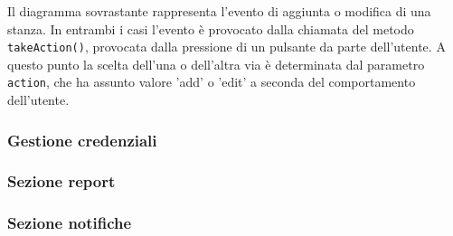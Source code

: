Il diagramma sovrastante rappresenta l'evento di aggiunta o modifica di una stanza.
In entrambi i casi l'evento è provocato dalla chiamata del metodo \texttt{takeAction()}, provocata dalla pressione di un pulsante da parte dell'utente. A questo punto la scelta dell'una o dell'altra via è determinata dal parametro \texttt{action}, che ha assunto valore 'add' o 'edit' a seconda del comportamento dell'utente.
\subsubsection{Gestione credenziali}
\subsubsection{Sezione report}
\subsubsection{Sezione notifiche}



